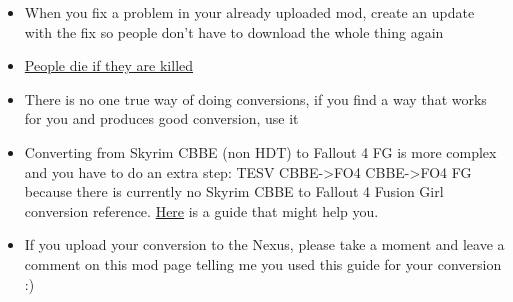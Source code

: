 \begin{itemize}
    \item When you fix a problem in your already uploaded mod, create an update with the fix so people don't have to download the whole thing again
    \item \href{https://i3.kym-cdn.com/photos/images/original/000/070/976/PEOPLE_DIE_IF_THEY_ARE_KILLED.jpg}{People die if they are killed}
    \item There is no one true way of doing conversions, if you find a way that works for you and produces good conversion, use it
    \item Converting from Skyrim CBBE (non HDT) to Fallout 4 FG is more complex and you have to do an extra step: TESV CBBE->FO4 CBBE->FO4 FG 
    because there is currently no Skyrim CBBE to Fallout 4 Fusion Girl conversion reference. \href{https://www.nexusmods.com/fallout4/mods/21111}{Here} 
    is a guide that might help you.
    \item If you upload your conversion to the Nexus, please take a moment and leave a comment on this mod page telling me you used this guide for your conversion :)
\end{itemize}